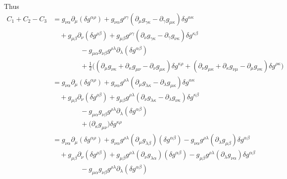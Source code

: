 \documentclass{article}
\theoremstyle{definition}
\begin{document}
Thus 
\begin{align}
    C_1 + C_2 - C_3 &= g_{\nu\alpha} \partial_\mu (\delta g^{\alpha\rho}) +  g_{\nu\alpha} g^{\rho\gamma} (\partial_\mu g_{\gamma \kappa}  - \partial_\gamma g_{\mu\kappa} ) \delta g^{\alpha \kappa} \nonumber \\
                    & \quad+ g_{\mu\beta} \partial_\nu (\delta g^{\rho\beta}) + g_{\mu\beta} g^{\rho \gamma} (\partial_\nu g_{\gamma \kappa}  - \partial_\gamma g_{\nu\kappa}) \delta g^{\kappa\beta} \nonumber \\
                    & \qquad \qquad - g_{\mu\alpha} g_{\nu\beta} g^{\rho\lambda} \partial_\lambda (\delta g^{\alpha\beta} ) \nonumber \\
                    & \qquad \qquad + \frac{1}{2} \big( (\partial_\mu g_{\nu \kappa} + \partial_\kappa g_{\mu \nu} - \partial_\nu g_{\mu\kappa} )\delta g^{\kappa\rho} + ( \partial_\nu g_{\mu \kappa} + \partial_\kappa g_{\nu \mu} - \partial_\mu g_{\nu\kappa} ) \delta g^{\rho \kappa} \big) 
                    \\
                    &= g_{\nu\alpha} \partial_\mu (\delta g^{\alpha\rho}) +  g_{\nu\alpha} g^{\rho\lambda} (\partial_\mu g_{\lambda \kappa}  - \partial_\lambda g_{\mu\kappa} ) \delta g^{\alpha \kappa} \nonumber \\
                    & \quad+ g_{\mu\beta} \partial_\nu (\delta g^{\rho\beta}) + g_{\mu\beta} g^{\rho \lambda} (\partial_\nu g_{\lambda \kappa}  - \partial_\lambda g_{\nu\kappa}) \delta g^{\kappa\beta} \nonumber \\
                    & \qquad \qquad - g_{\mu\alpha} g_{\nu\beta} g^{\rho\lambda} \partial_\lambda (\delta g^{\alpha\beta} ) \nonumber \\
                    & \qquad \qquad + \big( \partial_\kappa g_{\mu \nu} \big)\delta g^{\kappa\rho} 
                    \\
                    &= g_{\nu\alpha} \partial_\mu (\delta g^{\alpha\rho}) + g_{\nu\alpha} g^{\rho\lambda} (\partial_\mu g_{\lambda \beta}) (\delta g^{\alpha \beta}) - g_{\nu\alpha} g^{\rho\lambda} (  \partial_\lambda g_{\mu\beta} ) \delta g^{\alpha \beta} \nonumber \\
                    & \quad+ g_{\mu\beta} \partial_\nu (\delta g^{\rho\beta}) +g_{\mu\beta} g^{\rho \lambda} (\partial_\nu g_{\lambda \alpha}) ( \delta g^{\alpha\beta} ) - g_{\mu\beta} g^{\rho \lambda} (  \partial_\lambda g_{\nu\alpha}) \delta g^{\alpha\beta} \nonumber \\
                    & \qquad \qquad - g_{\mu\alpha} g_{\nu\beta} g^{\rho\lambda} \partial_\lambda (\delta g^{\alpha\beta} ) \nonumber \\

\end{align}
\end{document}

